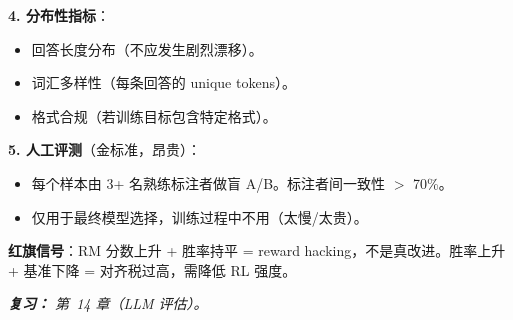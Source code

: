 \begin{questionbox}
\textbf{4. 分布性指标}：

\begin{itemize}
  \item 回答长度分布（不应发生剧烈漂移）。
  \item 词汇多样性（每条回答的 unique tokens）。
  \item 格式合规（若训练目标包含特定格式）。
\end{itemize}

\textbf{5. 人工评测}（金标准，昂贵）：

\begin{itemize}
  \item 每个样本由 3+ 名熟练标注者做盲 A/B。标注者间一致性 $>$ 70\%。
  \item 仅用于最终模型选择，训练过程中不用（太慢/太贵）。
\end{itemize}

\textbf{红旗信号}：RM 分数上升 + 胜率持平 = reward hacking，不是真改进。胜率上升 + 基准下降 = 对齐税过高，需降低 RL 强度。

\emph{\textbf{复习：} 第~14 章（LLM 评估）。}
\end{questionbox}

